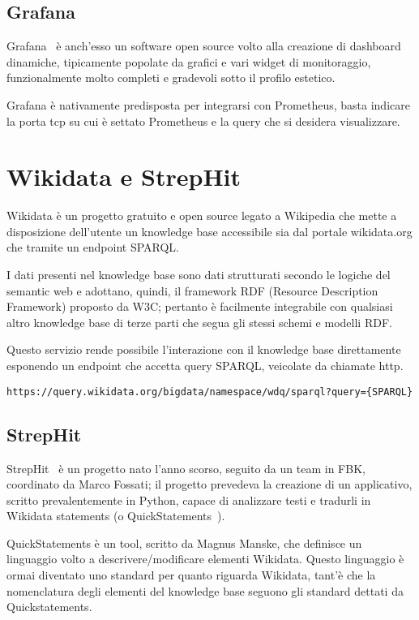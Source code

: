 \subsection{Grafana}
Grafana~\cite{grafana} è anch'esso un software open source volto alla creazione di dashboard dinamiche, tipicamente popolate da grafici e vari widget di monitoraggio, 
funzionalmente molto completi e gradevoli sotto il profilo estetico. 

Grafana è nativamente predisposta per integrarsi con Prometheus, basta indicare la porta tcp su cui è settato Prometheus e la query che si desidera visualizzare.   

\section{Wikidata e StrepHit}
Wikidata è un progetto gratuito e open source legato a Wikipedia che mette a disposizione dell'utente un knowledge base accessibile sia dal portale wikidata.org che tramite un endpoint SPARQL.

I dati presenti nel knowledge base sono dati strutturati secondo le logiche del semantic web e adottano, quindi, il framework RDF (Resource Description Framework) proposto da W3C; 
pertanto è facilmente integrabile con qualsiasi altro knowledge base di terze parti che segua gli stessi schemi e modelli RDF.

Questo servizio rende possibile l'interazione con il knowledge base direttamente esponendo un endpoint che accetta query SPARQL, veicolate da chiamate http. 

\begin{lstlisting}[style=YmlStyle, caption=SPARQL endpoint]
    https://query.wikidata.org/bigdata/namespace/wdq/sparql?query={SPARQL}
\end{lstlisting}

\subsection{StrepHit}
StrepHit~\cite{strephit} è un progetto nato l'anno scorso, seguito da un team in FBK, coordinato da Marco Fossati; il progetto prevedeva la creazione di un applicativo, scritto prevalentemente 
in Python, capace di analizzare testi e tradurli in Wikidata statements (o QuickStatements~\cite{quickstatements}).  

QuickStatements è un tool, scritto da Magnus Manske, che definisce un linguaggio volto a descrivere/modificare elementi Wikidata. Questo linguaggio è ormai diventato uno standard 
per quanto riguarda Wikidata, tant'è che la nomenclatura degli elementi del knowledge base seguono gli standard dettati da Quickstatements.

